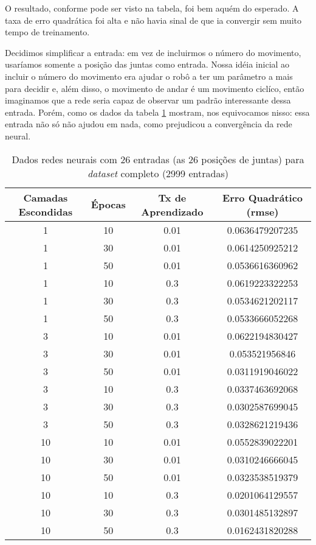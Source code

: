 \documentclass[twoside,conference,a4paper]{IEEEtran}
\begin{document}
O resultado, conforme pode ser visto na tabela, foi bem aquém do esperado. A taxa de erro quadrática foi alta e não havia sinal de que ia convergir sem muito tempo de treinamento.

Decidimos simplificar a entrada: em vez de incluirmos o número do movimento, usaríamos somente a posição das juntas como entrada. Nossa idéia inicial ao incluir o número do movimento era ajudar o robô a ter um parâmetro a mais para decidir e, além disso, o movimento de andar é um movimento ciclíco, então imaginamos que a rede seria capaz de observar um padrão interessante dessa entrada. Porém, como os dados da tabela \ref{redes_neurais_tabela_2} mostram, nos equivocamos nisso: essa entrada não só não ajudou em nada, como prejudicou a convergência da rede neural.

 \begin{table}[h]
\caption{Dados redes neurais com 26 entradas (as 26 posições de juntas) para \textsl{dataset} completo (2999 entradas)}
 \label{redes_neurais_tabela_2}
 \begin{center}
 \begin{tabular}{|c|c|c|c|}
 \hline
 Camadas Escondidas & Épocas & Tx de Aprendizado & Erro Quadrático (rmse) \\
 \hline
 1 & 10 & 0.01 & 0.0636479207235 \\
 1 & 30 & 0.01 & 0.0614250925212 \\
 1 & 50 & 0.01 & 0.0536616360962 \\
 1 & 10 & 0.3 & 0.0619223322253 \\
 1 & 30 & 0.3 & 0.0534621202117 \\
 1 & 50 & 0.3 & 0.0533666052268 \\
 3 & 10 &  0.01 & 0.0622194830427\\
 3 &  30 & 0.01 & 0.053521956846 \\
 3 &  50 & 0.01 & 0.0311919046022\\
 3 & 10 &  0.3 & 0.0337463692068 \\
 3 &  30 & 0.3 & 0.0302587699045 \\
 3 &  50 & 0.3 &  0.0328621219436\\
 10 & 10 & 0.01 &  0.0552839022201 \\
10 &  30 & 0.01 & 0.0310246666045 \\
10 &  50 & 0.01 & 0.0323538519379 \\
10 & 10 & 0.3  &  0.0201064129557 \\
10 &  30 & 0.3 & 0.0301485132897 \\
10 &  50 & 0.3 & 0.0162431820288 \\
 \hline
 \end{tabular}
 \end{center}
 \end{table}
\end{document}
